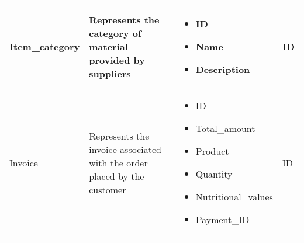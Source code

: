 \begin{longtable}{|p{}|p{} |p{}|p{} |}
    Item\_category & Represents the category of material provided by suppliers &
    \begin{itemize}
        \vspace{-1em}
        \item ID
        \item Name
        \item Description
    \end{itemize}
    &  ID \\\hline

    Invoice & Represents the invoice associated with the order placed by the customer &
        \begin{itemize}
            \vspace{-1em}
            \item ID
            \item Total\_amount
            \item Product
            \item Quantity
            \item Nutritional\_values
            \item Payment\_ID
        \end{itemize}
        &  ID \\\hline
\end{longtable}